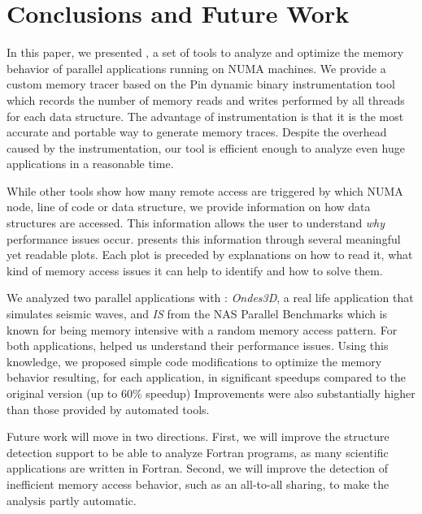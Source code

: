 
\section{Conclusions and Future Work}
\label{sec:concl}

In this paper, we presented \TABARNAC, a set of tools to analyze and
optimize the memory behavior of parallel applications running on NUMA
machines. We provide a custom memory tracer
based on the Pin dynamic binary instrumentation tool which records the
number of memory reads and writes performed by all threads for each data structure.
The advantage of instrumentation is that it is the most
accurate and portable way to generate memory traces.
Despite the overhead caused by the instrumentation, our tool is efficient enough to analyze even huge applications in a reasonable time.

While other tools show how many remote access are triggered by which NUMA
node, line of code or data structure, we provide information on how data
structures are accessed. This information allows the user to understand
\emph{why} performance issues occur. \TABARNAC presents this information through
several meaningful yet readable plots. Each plot is preceded by explanations
on how to read it, what kind of memory access issues it can help to identify
and how to solve them.

We analyzed two parallel applications with \TABARNAC: \emph{Ondes3D}, a real life application that
simulates seismic waves, and \emph{IS} from the NAS
Parallel Benchmarks which is known for being memory intensive with a random
memory access pattern. For both applications, \TABARNAC helped us
understand their performance issues.  Using this knowledge, we proposed
simple code modifications to optimize the memory behavior resulting, for each
application, in significant speedups compared to the original version (up to
$60\%$ speedup)
Improvements were also substantially higher than those provided by automated tools.

Future work will move in two directions. First, we will improve the
structure detection support to be able to analyze Fortran programs, as many
scientific applications are written in Fortran. Second, we will improve the
detection of inefficient memory access behavior, such as an all-to-all
sharing, to make the analysis partly automatic.
